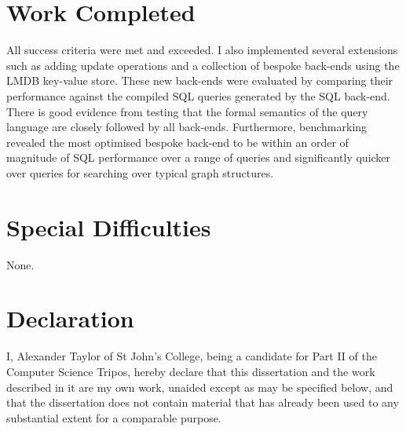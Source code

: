 \documentclass[12pt,a4paper,twoside,openright]{report}
\begin{document}
\section*{Work Completed}

All success criteria were met and exceeded. I also implemented several extensions such as adding update operations and a collection of bespoke back-ends using the LMDB key-value store. These new back-ends were evaluated by comparing their performance against the compiled SQL queries generated by the SQL back-end. There is good evidence from testing that the formal semantics of the query language are closely followed by all back-ends. Furthermore, benchmarking revealed the most optimised bespoke back-end to be within an order of magnitude of SQL performance over a range of queries and significantly quicker over queries for searching over typical graph structures.

\section*{Special Difficulties}

None.
 
\newpage
\section*{Declaration}

I, Alexander Taylor of St John's College, being a candidate for Part II of the Computer
Science Tripos, hereby declare
that this dissertation and the work described in it are my own work,
unaided except as may be specified below, and that the dissertation
does not contain material that has already been used to any substantial
extent for a comparable purpose.

\bigskip
{}

\medskip
{}

\tableofcontents

\listoffigures

\newpage


\pagestyle{headings}
\end{document}

